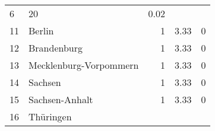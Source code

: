 \begin{longtable}{lXrrr}
       \num{6} &
       \num[round-mode=places,round-precision=2]{20} &
         \num[round-mode=places,round-precision=2]{0,02} \\

     11 &
     \multicolumn{1}{X}{ Berlin   } &


       \num{1} &
       \num[round-mode=places,round-precision=2]{3,33} &
         \num[round-mode=places,round-precision=2]{0} \\

     12 &
     \multicolumn{1}{X}{ Brandenburg   } &


       \num{1} &
       \num[round-mode=places,round-precision=2]{3,33} &
         \num[round-mode=places,round-precision=2]{0} \\

     13 &
     \multicolumn{1}{X}{ Mecklenburg-Vorpommern   } &


       \num{1} &
       \num[round-mode=places,round-precision=2]{3,33} &
         \num[round-mode=places,round-precision=2]{0} \\

     14 &
     \multicolumn{1}{X}{ Sachsen   } &


       \num{1} &
       \num[round-mode=places,round-precision=2]{3,33} &
         \num[round-mode=places,round-precision=2]{0} \\

     15 &
     \multicolumn{1}{X}{ Sachsen-Anhalt   } &


       \num{1} &
       \num[round-mode=places,round-precision=2]{3,33} &
         \num[round-mode=places,round-precision=2]{0} \\

     16 &
     \multicolumn{1}{X}{ Thüringen   } &



\end{longtable}

